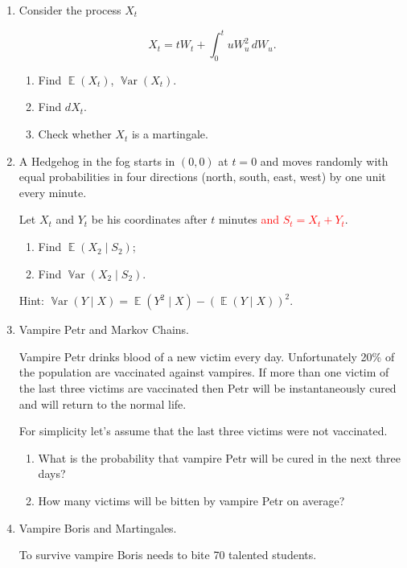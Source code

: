 \documentclass[12pt]{article}
\DeclareMathOperator{\E}{\mathbb{E}}
\DeclareMathOperator{\Var}{\mathbb{V}ar}
\begin{document}
\begin{enumerate}
\item Consider the process $X_t$

\[
X_t= tW_t + \int_0^t uW_u^2\, dW_u.
\]

\begin{enumerate}
    \item Find $\E(X_t)$, $\Var(X_t)$.
    \item Find $dX_t$.
    \item Check whether $X_t$ is a martingale.
\end{enumerate}

\item A Hedgehog in the fog starts in $(0, 0)$ at $t=0$ and moves randomly with equal probabilities in four directions (north, south, east, west) by one unit every minute. 

Let $X_t$ and $Y_t$ be his coordinates after $t$ minutes \textcolor{red}{and $S_t = X_t + Y_t$}.

\begin{enumerate}
    \item Find $\E(X_2 \mid S_2)$;
    \item Find $\Var(X_2 \mid S_2)$.
\end{enumerate}

Hint: $\Var(Y \mid X) = \E(Y^2 \mid X) - (\E(Y \mid X))^2$.

\newpage
    \item Vampire Petr and Markov Chains. 
    
    Vampire Petr drinks blood of a new victim every day. 
    Unfortunately 20\% of the population are vaccinated against vampires. 
    If more than one victim of the last three victims are vaccinated then Petr will be instantaneously cured and will return to the normal life. 
 
    For simplicity let's assume that the last three victims were not vaccinated. 
    
    \begin{enumerate}
        \item What is the probability that vampire Petr will be cured in the next three days?
        \item How many victims will be bitten by vampire Petr on average?
    \end{enumerate}
 
    \item Vampire Boris and Martingales.
    
    To survive vampire Boris needs to bite 70 talented students. 
    

\end{enumerate}
\end{document}
